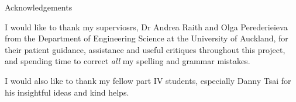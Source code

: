 \begin{center}
\Huge Acknowledgements
\end{center}
\vspace{1cm}

I would like to thank my superviosrs, Dr Andrea Raith and Olga Perederieieva from the Department of Engineering Science at the University of Auckland,
for their patient guidance, assistance and useful critiques throughout this project, and spending time to correct \emph{all} my spelling and grammar mistakes.

I would also like to thank my fellow part IV students, especially Danny Tsai for his insightful ideas and kind helps.
